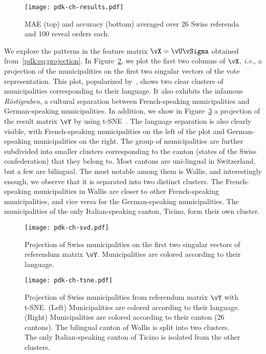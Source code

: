 \begin{figure}
	\texttt{[image: pdk-ch-results.pdf]}
	\caption{MAE (top) and accuracy (bottom) averaged over 26 Swiss referenda and 100 reveal orders each.}
	\label{pdk:fig:ch_results}
\end{figure}

We explore the patterns in the feature matrix $\vX = \vU \vSigma$ obtained from~\eqref{pdk:eq:projection}.
In Figure~\ref{pdk:fig:ch_svd}, we plot the first two columns of $\vX$, \textit{i.e.}, a projection of the municipalities on the first two singular vectors of the vote representation.
This plot, popularized by~\citet{etter2014mining}, shows two clear clusters of municipalities corresponding to their language.
It also exhibits the infamous \textit{Röstigraben}, a cultural separation between French-speaking municipalities and German-speaking municipalities.
In addition, we show in Figure~\ref{pdk:fig:ch_tsne} a projection of the result matrix $\vY$ by using t-SNE~\citep{maaten2008visualizing}.
The language separation is also clearly visible, with French-speaking municipalities on the left of the plot and German-speaking municipalities on the right.
The group of municipalities are further subdivided into smaller clusters corresponding to the canton (states of the Swiss confederation) that they belong to.
Most cantons are uni-lingual in Switzerland, but a few are bilingual.
The most notable among them is Wallis, and interestingly enough, we observe that it is separated into two distinct clusters.
The French-speaking municipalities in Wallis are closer to other French-speaking municipalities, and vice versa for the German-speaking municipalities.
The municipalities of the only Italian-speaking canton, Ticino, form their own cluster.

\begin{figure}
	\texttt{[image: pdk-ch-svd.pdf]}
	\caption{
		Projection of Swiss municipalities on the first two singular vectors of referendum matrix $\vY$.
		Municipalities are colored according to their language.
	}
	\label{pdk:fig:ch_svd}
\end{figure}

\begin{figure}
	\texttt{[image: pdk-ch-tsne.pdf]}
	\caption{
		Projection of Swiss municipalities from referendum matrix $\vY$ with t-SNE.
		(Left) Municipalities are colored according to their language.
		(Right) Municipalities are colored according to their canton (26 cantons).
		The bilingual canton of Wallis is split into two clusters.
		The only Italian-speaking canton of Ticino is isolated from the other clusters.
	}
	\label{pdk:fig:ch_tsne}
\end{figure}

